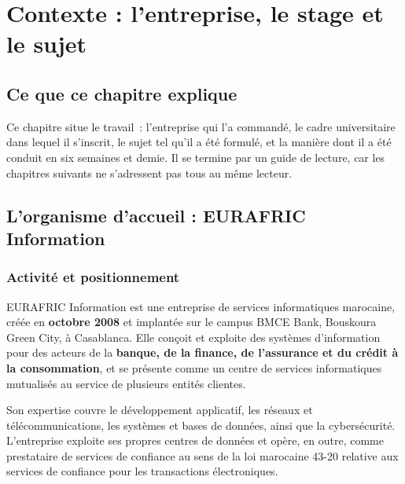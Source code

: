 %

\chapter{Contexte : l'entreprise, le stage et le sujet}
\label{chap:contexte}

\section*{Ce que ce chapitre explique}

Ce chapitre situe le travail~: l'entreprise qui l'a commandé, le cadre
universitaire dans lequel il s'inscrit, le sujet tel qu'il a été formulé, et la
manière dont il a été conduit en six semaines et demie. Il se termine par un
guide de lecture, car les chapitres suivants ne s'adressent pas tous au même
lecteur.

\section{L'organisme d'accueil : EURAFRIC Information}

\subsection{Activité et positionnement}

EURAFRIC Information est une entreprise de services informatiques marocaine,
créée en \textbf{octobre 2008} et implantée sur le campus BMCE Bank, Bouskoura
Green City, à Casablanca. Elle conçoit et exploite des systèmes d'information
pour des acteurs de la \textbf{banque, de la finance, de l'assurance et du crédit
à la consommation}, et se présente comme un centre de services informatiques
mutualisés au service de plusieurs entités clientes.

Son expertise couvre le développement applicatif, les réseaux et
télécommunications, les systèmes et bases de données, ainsi que la
cybersécurité. L'entreprise exploite ses propres centres de données et opère,
en outre, comme prestataire de services de confiance au sens de la loi marocaine
43-20 relative aux services de confiance pour les transactions électroniques.

